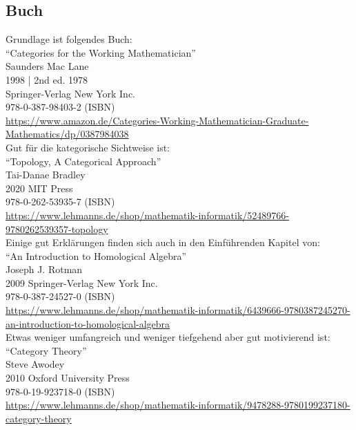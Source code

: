 \documentclass[a4paper]{amsart}
\theoremstyle{definition}
\begin{document}
\subsection*{Buch}
Grundlage ist folgendes Buch:\\
"`Categories for the Working Mathematician"'\\
Saunders Mac Lane\\
1998 | 2nd ed. 1978\\
Springer-Verlag New York Inc.\\
978-0-387-98403-2 (ISBN)\\
{\tiny
   \url{https://www.amazon.de/Categories-Working-Mathematician-Graduate-Mathematics/dp/0387984038}}\\

Gut für die kategorische Sichtweise ist:\\
"`Topology, A Categorical Approach"'\\
Tai-Danae Bradley\\
2020 MIT Press\\
978-0-262-53935-7 (ISBN)\\
{\tiny
\url{https://www.lehmanns.de/shop/mathematik-informatik/52489766-9780262539357-topology}}\\

Einige gut Erklärungen finden sich auch in den Einführenden Kapitel von:\\
"`An Introduction to Homological Algebra"'\\
Joseph J. Rotman\\
2009 Springer-Verlag New York Inc.\\
978-0-387-24527-0 (ISBN)\\
{\tiny \url{https://www.lehmanns.de/shop/mathematik-informatik/6439666-9780387245270-an-introduction-to-homological-algebra}}\\

Etwas weniger umfangreich und weniger tiefgehend aber gut motivierend ist:
"`Category Theory"'\\
Steve Awodey\\
2010 Oxford University Press\\
978-0-19-923718-0 (ISBN)\\
{\tiny\url{https://www.lehmanns.de/shop/mathematik-informatik/9478288-9780199237180-category-theory}}\\
\end{document}
